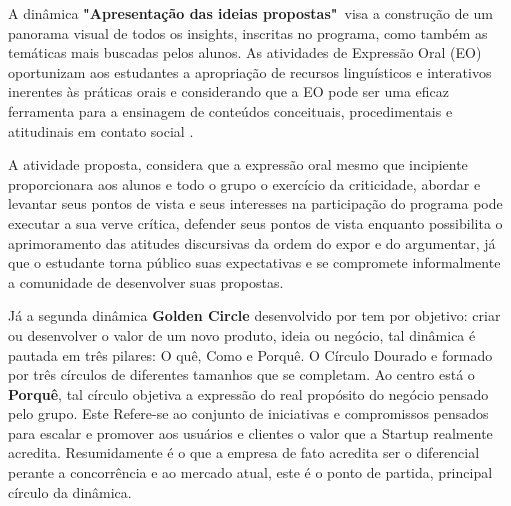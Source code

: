 A dinâmica \textbf{"Apresentação das ideias propostas"}\ visa a construção de um panorama visual de todos os insights, inscritas no programa, como também as temáticas mais buscadas pelos alunos. As atividades de Expressão Oral (EO) oportunizam aos estudantes a apropriação de recursos linguísticos e interativos inerentes às práticas orais e considerando que a EO pode ser uma eficaz ferramenta para a ensinagem de conteúdos conceituais, procedimentais e atitudinais em contato social \cite{baltar_genero_2010}.

A atividade proposta, considera que a expressão oral mesmo que incipiente proporcionara aos alunos e todo o grupo o exercício da criticidade, abordar e levantar seus pontos de vista e seus interesses na participação do programa pode executar a sua verve crítica, defender seus pontos de vista enquanto possibilita o aprimoramento das atitudes discursivas da ordem do expor e do argumentar, já que o estudante torna público suas expectativas e se compromete informalmente a comunidade de desenvolver suas propostas. 

Já a segunda dinâmica \textbf{Golden Circle} desenvolvido por  tem por objetivo: criar ou desenvolver o valor de um novo produto, ideia ou negócio, tal dinâmica é pautada em três pilares: O quê, Como e Porquê. O Círculo Dourado e formado por três círculos de diferentes tamanhos que se completam. Ao centro está o \textbf{Porquê}, tal círculo objetiva a expressão do real propósito do negócio pensado pelo grupo. Este Refere-se ao conjunto de iniciativas e compromissos pensados para escalar e promover aos usuários e clientes o valor que a Startup realmente acredita. Resumidamente é o que a empresa de fato acredita ser o  diferencial perante a concorrência e ao mercado atual, este é o ponto de partida, principal círculo da dinâmica. 


